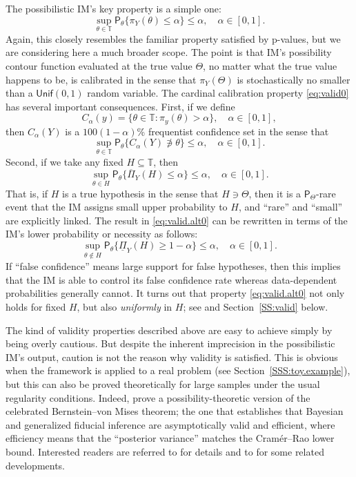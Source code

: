 \documentclass[12pt]{article}
\def\TT{\mathbb{T}}
\def\prob{\mathsf{P}}
\def\lPi{\underline{\Pi}}
\def\uPi{\overline{\Pi}}
\def\unif{\mathsf{Unif}}
\begin{document}
The possibilistic IM's key property is a simple one: 
\begin{equation}
\label{eq:valid0}
\sup_{\theta \in \TT} \prob_\theta\{ \pi_Y(\theta) \leq \alpha \} \leq \alpha, \quad \alpha \in [0,1].
\end{equation}
Again, this closely resembles the familiar property satisfied by p-values, but we are considering here a much broader scope.  The point is that IM's possibility contour function evaluated at the true value $\Theta$, no matter what the true value happens to be, is calibrated in the sense that $\pi_Y(\Theta)$ is stochastically no smaller than a $\unif(0,1)$ random variable.  The cardinal calibration property \eqref{eq:valid0} has several important consequences.  First, if we define 
\[ C_\alpha(y) = \{ \theta \in \TT: \pi_y(\theta) > \alpha\}, \quad \alpha \in [0,1], \]
then $C_\alpha(Y)$ is a $100(1-\alpha)$\% frequentist confidence set in the sense that 
\[ \sup_{\theta \in \TT} \prob_\theta\{ C_\alpha(Y) \not\ni \theta\} \leq \alpha, \quad \alpha \in [0,1]. \]
Second, if we take any fixed $H \subseteq \TT$, then 
\begin{equation}
\label{eq:valid.alt0}
\sup_{\theta \in H} \prob_\theta\{ \uPi_Y(H) \leq \alpha \} \leq \alpha, \quad \alpha \in [0,1]. 
\end{equation}
That is, if $H$ is a true hypothesis in the sense that $H \ni \Theta$, then it is a $\prob_\Theta$-rare event that the IM assigns small upper probability to $H$, and ``rare'' and ``small'' are explicitly linked.  The result in \eqref{eq:valid.alt0} can be rewritten in terms of the IM's lower probability or necessity as follows:
\[ \sup_{\theta \not\in H} \prob_\theta\{ \lPi_Y(H) \geq 1-\alpha \} \leq \alpha, \quad \alpha \in [0,1]. \]
If ``false confidence'' means large support for false hypotheses, then this implies that the IM is able to control its false confidence rate whereas data-dependent probabilities generally cannot.  It turns out that property \eqref{eq:valid.alt0} not only holds for fixed $H$, but also {\em uniformly} in $H$; see \citet{cella.martin.probing} and Section~\ref{SS:valid} below.  

The kind of validity properties described above are easy to achieve simply by being overly cautious.  But despite the inherent imprecision in the possibilistic IM's output, caution is not the reason why validity is satisfied.  This is obvious when the framework is applied to a real problem (see Section~\ref{SSS:toy.example}), but this can also be proved theoretically for large samples under the usual regularity conditions.  Indeed, \citet{imbvm.ext} prove a possibility-theoretic version of the celebrated Bernstein--von Mises theorem; the one that establishes that Bayesian \citep[e.g.,][Ch.~10.2]{vaart1998} and generalized fiducial inference \citep[e.g.,][]{hannig.review} are asymptotically valid and efficient, where efficiency means that the ``posterior variance'' matches the Cram\'er--Rao lower bound.  Interested readers are referred to \citet{imbvm.ext} for details and to \citet{immc, reimagined} for some related developments. 
\end{document}
